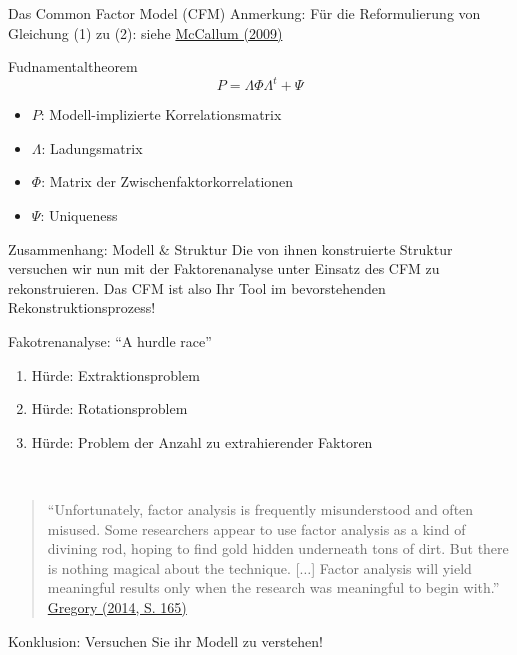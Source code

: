 \documentclass[
  ignorenonframetext,
]{beamer}
\providecommand{\tightlist}{%
  \setlength{\itemsep}{0pt}\setlength{\parskip}{0pt}}
\begin{document}
\begin{frame}{Das Common Factor Model (CFM)}
\protect\hypertarget{das-common-factor-model-cfm}{}
Anmerkung: Für die Reformulierung von Gleichung (1) zu (2): siehe
\href{http://dx.doi.org/10.4135/9780857020994.n6}{McCallum (2009)}

\begin{alertblock}{Fudnamentaltheorem}
  \begin{equation}
    P = \Lambda \Phi \Lambda^{t} + \Psi
  \end{equation}
\end{alertblock}

\begin{itemize}
\tightlist
\item
  \(P\): Modell-implizierte Korrelationsmatrix
\item
  \(\Lambda\): Ladungsmatrix
\item
  \(\Phi\): Matrix der Zwischenfaktorkorrelationen
\item
  \(\Psi\): Uniqueness
\end{itemize}

\begin{block}{Zusammenhang: Modell \& Struktur}
Die von ihnen konstruierte Struktur versuchen wir nun mit der Faktorenanalyse
unter Einsatz des CFM zu rekonstruieren. Das CFM ist also Ihr Tool im
bevorstehenden Rekonstruktionsprozess!
\end{block}
\end{frame}

\begin{frame}{Fakotrenanalyse: ``A hurdle race''}
\protect\hypertarget{fakotrenanalyse-a-hurdle-race}{}
\begin{enumerate}
\tightlist
\item
  Hürde: Extraktionsproblem
\item
  Hürde: Rotationsproblem
\item
  Hürde: Problem der Anzahl zu extrahierender Faktoren
\end{enumerate}

~

\begin{quote}
``Unfortunately, factor analysis is frequently misunderstood and often
misused. Some researchers appear to use factor analysis as a kind of
divining rod, hoping to find gold hidden underneath tons of dirt. But
there is nothing magical about the technique. {[}\(\dots\){]} Factor
analysis will yield meaningful results only when the research was
meaningful to begin with.''
\href{https://www.pearson.com/us/higher-education/program/Gregory-Psychological-Testing-History-Principles-and-Applications-7th-Edition/PGM332874.html}{Gregory
(2014, S. 165)}
\end{quote}

Konklusion: Versuchen Sie ihr Modell zu verstehen!
\end{frame}
\end{document}
